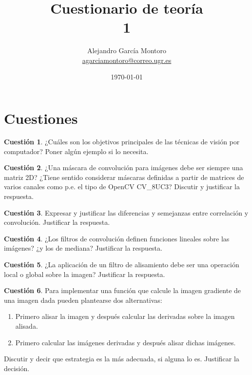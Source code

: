 \documentclass[a4paper, 11pt]{article}
\title{Cuestionario de teoría \\ 1}
\author{Alejandro García Montoro\\
    \href{mailto:agarciamontoro@correo.ugr.es}{agarciamontoro@correo.ugr.es}}
\date{\today}
\theoremstyle{definition}
\theoremstyle{theorem}
\newtheorem{cuestion}{Cuestión}
\begin{document}
  \maketitle

  \section{Cuestiones}

  \begin{cuestion}
      ¿Cuáles son los objetivos principales de las técnicas de visión por computador? Poner algún ejemplo si lo necesita.
  \end{cuestion}

  \begin{cuestion}
      ¿Una máscara de convolución para imágenes debe ser siempre una matriz 2D? ¿Tiene sentido considerar máscaras definidas a partir de matrices de varios canales como p.e. el tipo de OpenCV CV\_8UC3? Discutir y justificar la respuesta.
  \end{cuestion}

  \begin{cuestion}
      Expresar y justificar las diferencias y semejanzas entre correlación y convolución. Justificar la respuesta.
  \end{cuestion}

  \begin{cuestion}
      ¿Los filtros de convolución definen funciones lineales sobre las imágenes? ¿y los de mediana? Justificar la respuesta.
  \end{cuestion}

  \begin{cuestion}
      ¿La aplicación de un filtro de alisamiento debe ser una operación local o global sobre la imagen? Justificar la respuesta.
  \end{cuestion}

  \begin{cuestion}
      Para implementar una función que calcule la imagen gradiente de una imagen dada pueden plantearse dos alternativas:
      \begin{enumerate}
          \item Primero alisar la imagen y después calcular las derivadas sobre la imagen alisada.
          \item Primero calcular las imágenes derivadas y después alisar dichas imágenes.
      \end{enumerate}

      Discutir y decir que estrategia es la más adecuada, si alguna lo es. Justificar la decisión.
  \end{cuestion}
\end{document}
